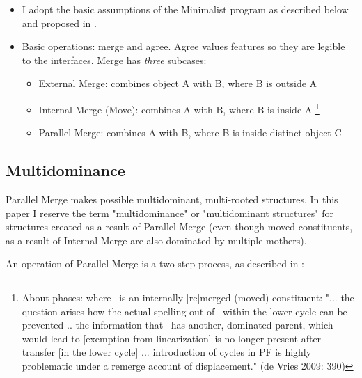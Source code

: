 \documentclass[paper=letter, fontsize=12pt]{scrartcl} %
\numberwithin{equation}{section} %
\numberwithin{figure}{section} %
\numberwithin{table}{section} %
\begin{document}
\begin{itemize}
\item I adopt the basic assumptions of the Minimalist program as described below and proposed in \cite{Chomsky:1995,Chomsky:2000,Chomsky:2001}. 
\item Basic operations: {\sc merge} and {\sc agree}. {\sc Agree} values features so they are legible to the interfaces. {\sc Merge} has \textit{three} subcases:
	\begin{itemize}
		\item External Merge: combines object A with B, where B is outside A
		\item Internal Merge (Move): combines A with B, where B is inside A \cite[12]{Chomsky:2005}\footnote{About phases: where \textdelta\ is an internally [re]merged (moved) constituent: "... the question arises how the actual spelling out of \textdelta\ within the lower cycle can be prevented .. the information that \textdelta\ has another, dominated parent, which would lead to [exemption from linearization] is no longer present after transfer [in the lower cycle] ... introduction of cycles in PF is highly problematic under a remerge account of displacement." (de Vries 2009: 390)}
		\item Parallel Merge: combines A with B, where B is inside distinct object C \citep{Citko:2005}
	\end{itemize}
\end{itemize}


\subsection{Multidominance}

Parallel Merge makes possible multidominant, multi-rooted structures. In this paper I reserve the term "multidominance" or "multidominant structures" for structures created as a result of Parallel Merge (even though moved constituents, as a result of Internal Merge are also dominated by multiple mothers).

An operation of Parallel Merge is a two-step process, as described in \citet{Citko:2011}:
\end{document}
